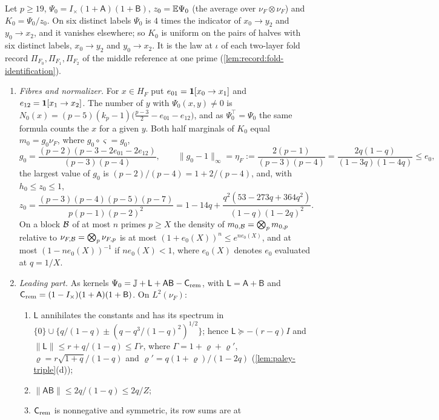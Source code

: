 \begin{lemma}\label{lem:old-f-law}
Let $p\ge19$, $\Psi_0=I_\times(1+\mathsf A)(1+\mathsf B)$, $z_0=\mathbb E\Psi_0$ (the
average over $\nu_F\otimes\nu_F$) and $K_0=\Psi_0/z_0$. On six distinct labels
$\Psi_0$ is $4$ times the indicator of $x_0\to y_2$ and $y_0\to x_2$, and it
vanishes elsewhere; so $K_0$ is uniform on the pairs of halves with six
distinct labels, $x_0\to y_2$ and $y_0\to x_2$. It is the law at $\iota$ of
each two-layer fold record $\Pi_{F_0},\Pi_{F_1},\Pi_{F_2}$ of the middle
reference at one prime (\cref{lem:record:fold-identification}).
\begin{enumerate}[label=(\alph*)]
\item \emph{Fibres and normalizer.} For $x\in H_F$ put
 $e_{01}=\mathbf 1[x_0\to x_1]$ and $e_{12}=\mathbf 1[x_1\to x_2]$. The number of $y$ with
 $\Psi_0(x,y)\ne0$ is $N_0(x)=(p-5)(k_p-1)\bigl(\frac{p-3}2-e_{01}-e_{12}\bigr)$,
 and as $\Psi_0^\top=\Psi_0$ the same formula counts the $x$ for a given $y$.
 Both half marginals of $K_0$ equal $m_0=g_0\nu_F$, where $g_0\circ\varsigma=g_0$,
 \[
  g_0=\frac{(p-2)(p-3-2e_{01}-2e_{12})}{(p-3)(p-4)},\qquad
  \|g_0-1\|_\infty=\eta_F:=\frac{2(p-1)}{(p-3)(p-4)}
  =\frac{2q(1-q)}{(1-3q)(1-4q)}\le e_0,
 \]
 the largest value of $g_0$ is $(p-2)/(p-4)=1+2/(p-4)$, and, with
 $h_0\le z_0\le1$,
 \[
  z_0=\frac{(p-3)(p-4)(p-5)(p-7)}{p(p-1)(p-2)^2}
  =1-14q+\frac{q^2(53-273q+364q^2)}{(1-q)(1-2q)^2}.
 \]
 On a block $\mathcal B$ of at most $n$ primes $p\ge X$ the density of
 $m_{0,\mathcal B}=\bigotimes_pm_{0,p}$ relative to $\nu_{F,\mathcal B}=\bigotimes_p\nu_{F,p}$
 is at most $(1+e_0(X))^n\le e^{ne_0(X)}$, and at most $(1-ne_0(X))^{-1}$ if
 $ne_0(X)<1$, where $e_0(X)$ denotes $e_0$ evaluated at $q=1/X$.
\item \emph{Leading part.} As kernels
 $\Psi_0=\mathbb J+\mathsf L+\mathsf A\mathsf B-\mathsf C_{\rm rem}$, with
 $\mathsf L=\mathsf A+\mathsf B$ and
 $\mathsf C_{\rm rem}=(1-I_\times)(1+\mathsf A)(1+\mathsf B)$. On $L^2(\nu_F)$:
 \begin{enumerate}[label=(\roman*)]
 \item $\mathsf L$ annihilates the constants and has its spectrum in
  $\{0\}\cup\{q/(1-q)\pm(q-q^3/(1-q)^2)^{1/2}\}$; hence $\mathsf L\succeq-(r-q)I$
  and $\|\mathsf L\|\le r+q/(1-q)\le\Gamma r$, where $\Gamma=1+\varrho+\varrho'$,
  $\varrho=r\sqrt{1+q}/(1-q)$ and $\varrho'=q(1+\varrho)/(1-2q)$
  (\cref{lem:paley-triple}(d));
 \item $\|\mathsf A\mathsf B\|\le2q/(1-q)\le2q/Z$;
 \item $\mathsf C_{\rm rem}$ is nonnegative and symmetric, its row sums are at

\end{enumerate}
\end{enumerate}
\end{lemma}

